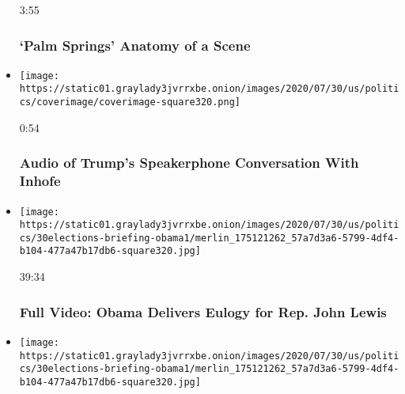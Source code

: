 \begin{itemize}
  3:55

  \hypertarget{palm-springs--anatomy-of-a-scene}{%
  \subsubsection{`Palm Springs' \textbar{} Anatomy of a
  Scene}\label{palm-springs--anatomy-of-a-scene}}
\item
  \href{https://www.nytimes3xbfgragh.onion/video/us/politics/100000007265038/trump-inhofe-audio-call.html?action=click\&module=video-series-bar\&region=header\&pgtype=Article\&playlistId=video/latest-video}{}

  \texttt{[image: https://static01.graylady3jvrrxbe.onion/images/2020/07/30/us/politics/coverimage/coverimage-square320.png]}

  0:54

  \hypertarget{audio-of-trumps-speakerphone-conversation-with-inhofe}{%
  \subsubsection{Audio of Trump's Speakerphone Conversation With
  Inhofe}\label{audio-of-trumps-speakerphone-conversation-with-inhofe}}
\item
  \href{https://www.nytimes3xbfgragh.onion/video/us/100000007264733/obama-john-lewis-funeral.html?action=click\&module=video-series-bar\&region=header\&pgtype=Article\&playlistId=video/latest-video}{}

  \texttt{[image: https://static01.graylady3jvrrxbe.onion/images/2020/07/30/us/politics/30elections-briefing-obama1/merlin\_175121262\_57a7d3a6-5799-4df4-b104-477a47b17db6-square320.jpg]}

  39:34

  \hypertarget{full-video-obama-delivers-eulogy-for-rep-john-lewis}{%
  \subsubsection{Full Video: Obama Delivers Eulogy for Rep. John
  Lewis}\label{full-video-obama-delivers-eulogy-for-rep-john-lewis}}
\item
  \href{https://www.nytimes3xbfgragh.onion/video/us/politics/100000007264823/john-lewis-funeral.html?action=click\&module=video-series-bar\&region=header\&pgtype=Article\&playlistId=video/latest-video}{}

  \texttt{[image: https://static01.graylady3jvrrxbe.onion/images/2020/07/30/us/politics/30elections-briefing-obama1/merlin\_175121262\_57a7d3a6-5799-4df4-b104-477a47b17db6-square320.jpg]}


\end{itemize}
